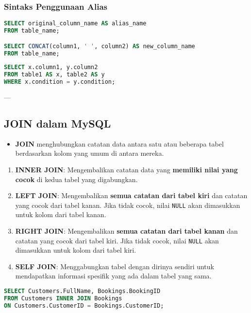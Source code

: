 \documentclass{article}
\begin{document}
\subsubsection{Sintaks Penggunaan Alias}
\begin{lstlisting}[language=SQL, caption={Renaming Kolom dan Concatenation}, captionpos=b]
SELECT original_column_name AS alias_name  
FROM table_name;

SELECT CONCAT(column1, ' ', column2) AS new_column_name
FROM table_name;
\end{lstlisting}
\begin{lstlisting}[language=SQL, caption={Querying Multiple Tables dengan Alias}, captionpos=b]
SELECT x.column1, y.column2
FROM table1 AS x, table2 AS y
WHERE x.condition = y.condition;
\end{lstlisting}

---

\subsection{JOIN dalam MySQL}
\begin{itemize}
    \item \textbf{JOIN} menghubungkan catatan data antara satu atau beberapa tabel berdasarkan kolom yang umum di antara mereka.
\end{itemize}

\begin{enumerate}
    \item \textbf{INNER JOIN}: Mengembalikan catatan data yang \textbf{memiliki nilai yang cocok} di kedua tabel yang digabungkan.
    \item \textbf{LEFT JOIN}: Mengembalikan \textbf{semua catatan dari tabel kiri} dan catatan yang cocok dari tabel kanan. Jika tidak cocok, nilai \texttt{NULL} akan dimasukkan untuk kolom dari tabel kanan.
    \item \textbf{RIGHT JOIN}: Mengembalikan \textbf{semua catatan dari tabel kanan} dan catatan yang cocok dari tabel kiri. Jika tidak cocok, nilai \texttt{NULL} akan dimasukkan untuk kolom dari tabel kiri.
    \item \textbf{SELF JOIN}: Menggabungkan tabel dengan dirinya sendiri untuk mendapatkan informasi spesifik yang ada dalam tabel yang sama.
\end{enumerate}

\begin{lstlisting}[language=SQL, caption={Contoh INNER JOIN}, captionpos=b]
SELECT Customers.FullName, Bookings.BookingID
FROM Customers INNER JOIN Bookings 
ON Customers.CustomerID = Bookings.CustomerID;
\end{lstlisting}
\end{document}
